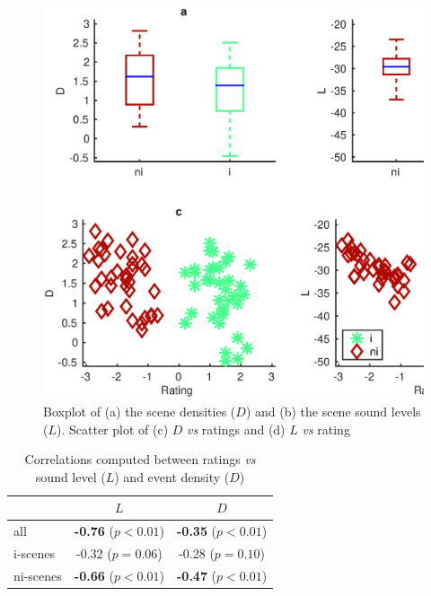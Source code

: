 \documentclass[twoside,twocolumn]{article}
\begin{document}
\begin{figure}[t!]
\centering
\includegraphics[width=\columnwidth]{../gfxMatlab/xp1_deSoLv_1.eps} 
\caption{\label{fig:xp1_deSoLv_1}  Boxplot of (a) the scene densities ($D$) and (b) the scene sound levels ($L$). Scatter plot of (c) $D$ \emph{vs} ratings and (d) $L$ \emph{vs} rating}
\end{figure}


\begin{table}[t]
\centering
\begin{tabular}{l c c} 
                & $L$                          & $D$    \\
\hline
all             & \textbf{-0.76} ($p<0.01$)    & \textbf{-0.35} ($p<0.01$) \\
i-scenes        & -0.32 ($p=0.06$)             & -0.28 ($p=0.10$) \\
ni-scenes       & \textbf{-0.66} ($p<0.01$)    & \textbf{-0.47} ($p<0.01$) \\

\hline
\end{tabular}
\vspace{0.5mm}
\caption{\label{tab:numGlobal} Correlations computed between ratings \emph{vs} sound level ($L$) and event density ($D$)}
\end{table}
\end{document}
